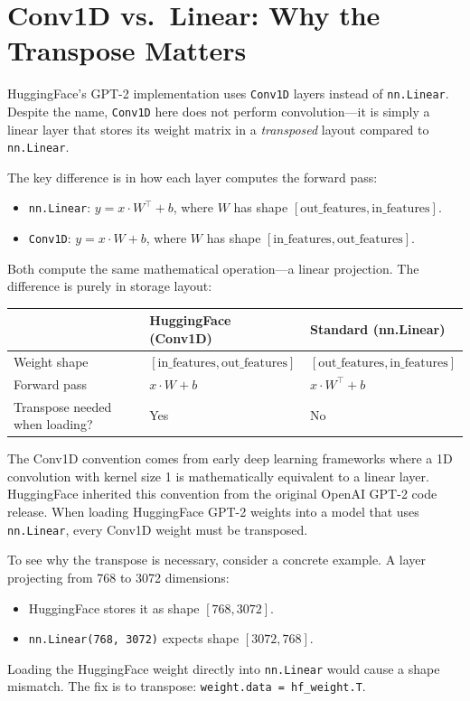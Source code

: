 \section{Conv1D vs.\ Linear: Why the Transpose Matters}

HuggingFace's GPT-2 implementation uses \texttt{Conv1D} layers instead of
\texttt{nn.Linear}. Despite the name, \texttt{Conv1D} here does not
perform convolution---it is simply a linear layer that stores its weight
matrix in a \emph{transposed} layout compared to \texttt{nn.Linear}.

The key difference is in how each layer computes the forward pass:
\begin{itemize}
  \item \texttt{nn.Linear}: $y = x \cdot W^\top + b$, where
        $W$ has shape $[\text{out\_features}, \text{in\_features}]$.
  \item \texttt{Conv1D}: $y = x \cdot W + b$, where
        $W$ has shape $[\text{in\_features}, \text{out\_features}]$.
\end{itemize}

Both compute the same mathematical operation---a linear projection. The
difference is purely in storage layout:

\begin{center}
\begin{tabular}{lll}
\toprule
 & \textbf{HuggingFace (Conv1D)} & \textbf{Standard (nn.Linear)} \\
\midrule
Weight shape & $[\text{in\_features}, \text{out\_features}]$ & $[\text{out\_features}, \text{in\_features}]$ \\
Forward pass & $x \cdot W + b$ & $x \cdot W^\top + b$ \\
Transpose needed when loading? & Yes & No \\
\bottomrule
\end{tabular}
\end{center}

\begin{keyconcept}
  The Conv1D convention comes from early deep learning frameworks where
  a 1D convolution with kernel size 1 is mathematically equivalent to a
  linear layer. HuggingFace inherited this convention from the original
  OpenAI GPT-2 code release. When loading HuggingFace GPT-2 weights into a
  model that uses \texttt{nn.Linear}, every Conv1D weight must be
  transposed.
\end{keyconcept}

To see why the transpose is necessary, consider a concrete example. A
layer projecting from 768 to 3072 dimensions:
\begin{itemize}
  \item HuggingFace stores it as shape $[768, 3072]$.
  \item \texttt{nn.Linear(768, 3072)} expects shape $[3072, 768]$.
\end{itemize}
Loading the HuggingFace weight directly into \texttt{nn.Linear} would cause
a shape mismatch. The fix is to transpose:
\texttt{weight.data = hf\_weight.T}.

